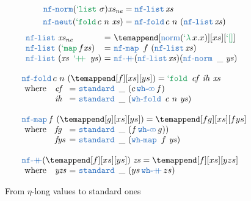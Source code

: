 \documentclass[preprint]{sigplanconf}
\begin{document}
\begin{figure}[h]
\begin{align*}
\nfnorm (\tylist) \mathit{xs_{ne}} &= \nflist \mathit{xs} \\
\nfneut (\tefold c ~n~ \mathit{xs}) &= \nffold c ~n~ (\nflist \mathit{xs})
\end{align*}
$$\begin{array}{@{\nflist~}l@{~=~}l}
  \mathit{xs_{ne}} & \temappend[\norm (\telam x. x)][xs][\tenil] \\
  (\temap f \mathit{xs}) & \nfmap ~f~ (\nflist \mathit{xs}) \\
  (\mathit{xs} \teappend \mathit{ys}) &
    \nfappend (\nflist \mathit{xs}) (\nfnorm ~\_~ \mathit{ys})
\end{array}$$

$$\begin{array}{ll@{~=~}l}
\multicolumn{3}{l}{\nffold c~n~(\temappend[f][xs][ys]) =
  \tefold~ \mathit{cf} ~\mathit{ih}~ \mathit{xs}} \\
\text{ where} & \mathit{cf} & \standard ~\_~ (c \whcomp f) \\
              & \mathit{ih} & \standard ~\_~ (\whfold~ c ~n~ \mathit{ys}) \\ \\

\multicolumn{3}{l}{\nfmap f~(\temappend[g][xs][ys]) = \temappend[fg][xs][fys]} \\
\text{ where} & \mathit{fg}  & \standard ~\_~ (f \whcomp g)) \\
              & \mathit{fys} & \standard ~\_~ (\whmap ~ f~ \mathit{ys}) \\ \\

\multicolumn{3}{l}{\nfappend (\temappend[f][xs][ys]) ~\mathit{zs} =
  \temappend[f][xs][yzs]} \\
\text{ where} & \mathit{yzs}  & \standard ~\_~ (ys \whappend zs)
\end{array}$$

\caption{From $\eta$-long values to standard ones}
\label{standnorm}
\end{figure}
\end{document}
